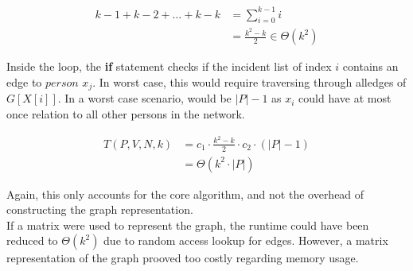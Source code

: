 \begin{align*}
k-1 + k-2 + \dots + k-k &= \sum^{k-1}_{i=0} i \\
 & = \frac{k^2-k}{2} \in \Theta \left( k^2 \right)
\end{align*} 

Inside the loop, the \textbf{if} statement checks if
the incident list of index $i$ contains an edge to $person$
$x_j$. In worst case, this would require traversing through 
alledges of $G[X[i]]$.
In a worst case scenario, would be $|P|-1$ as $x_i$ could
have at most once relation to all other persons in the 
network.

\begin{align*}
T(P, V, N, k) &= c_1 \cdot \frac{k^2-k}{2} \cdot c_2 \cdot \left( |P|-1 \right)\\
&= \Theta \left( k^2 \cdot |P| \right)
\end{align*}

Again, this only accounts for the core algorithm, and not 
the overhead of constructing the graph representation.\\

If a matrix were used to represent the graph, the runtime could have
been reduced to $\Theta \left( k^2 \right)$ due to random access
lookup for edges. However, a matrix representation of the graph 
prooved too costly regarding memory usage.







